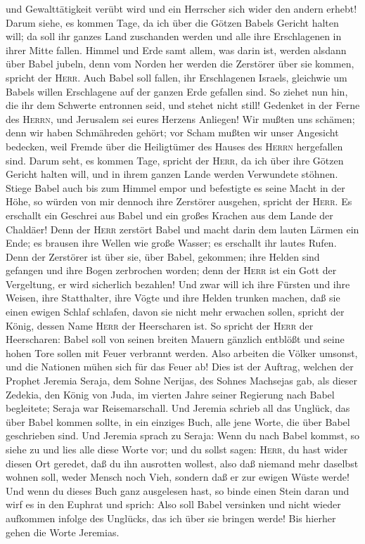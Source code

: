 und Gewalttätigkeit verübt wird und ein Herrscher sich wider den andern
erhebt!  Darum siehe, es kommen Tage, da ich über die
Götzen Babels Gericht halten will; da soll ihr ganzes Land zuschanden
werden und alle ihre Erschlagenen in ihrer Mitte fallen. 
Himmel und Erde samt allem, was darin ist, werden alsdann über Babel
jubeln, denn vom Norden her werden die Zerstörer über sie kommen,
spricht der \textsc{Herr}.  Auch Babel soll fallen, ihr
Erschlagenen Israels, gleichwie um Babels willen Erschlagene auf der
ganzen Erde gefallen sind.  So ziehet nun hin, die ihr
dem Schwerte entronnen seid, und stehet nicht still! Gedenket in der
Ferne des \textsc{Herrn}, und Jerusalem sei eures Herzens Anliegen!
 Wir mußten uns schämen; denn wir haben Schmähreden
gehört; vor Scham mußten wir unser Angesicht bedecken, weil Fremde über
die Heiligtümer des Hauses des \textsc{Herrn} hergefallen sind.
 Darum seht, es kommen Tage, spricht der \textsc{Herr},
da ich über ihre Götzen Gericht halten will, und in ihrem ganzen Lande
werden Verwundete stöhnen.  Stiege Babel auch bis zum
Himmel empor und befestigte es seine Macht in der Höhe, so würden von
mir dennoch ihre Zerstörer ausgehen, spricht der \textsc{Herr}.
 Es erschallt ein Geschrei aus Babel und ein großes
Krachen aus dem Lande der Chaldäer!  Denn der
\textsc{Herr} zerstört Babel und macht darin dem lauten Lärmen ein Ende;
es brausen ihre Wellen wie große Wasser; es erschallt ihr lautes Rufen.
 Denn der Zerstörer ist über sie, über Babel, gekommen;
ihre Helden sind gefangen und ihre Bogen zerbrochen worden; denn der
\textsc{Herr} ist ein Gott der Vergeltung, er wird sicherlich bezahlen!
 Und zwar will ich ihre Fürsten und ihre Weisen, ihre
Statthalter, ihre Vögte und ihre Helden trunken machen, daß sie einen
ewigen Schlaf schlafen, davon sie nicht mehr erwachen sollen, spricht
der König, dessen Name \textsc{Herr} der Heerscharen ist.
 So spricht der \textsc{Herr} der Heerscharen: Babel soll
von seinen breiten Mauern gänzlich entblößt und seine hohen Tore sollen
mit Feuer verbrannt werden. Also arbeiten die Völker umsonst, und die
Nationen mühen sich für das Feuer ab!  Dies ist der
Auftrag, welchen der Prophet Jeremia Seraja, dem Sohne Nerijas, des
Sohnes Machsejas gab, als dieser Zedekia, den König von Juda, im vierten
Jahre seiner Regierung nach Babel begleitete; Seraja war Reisemarschall.
 Und Jeremia schrieb all das Unglück, das über Babel
kommen sollte, in ein einziges Buch, alle jene Worte, die über Babel
geschrieben sind.  Und Jeremia sprach zu Seraja: Wenn du
nach Babel kommst, so siehe zu und lies alle diese Worte vor;
 und du sollst sagen: \textsc{Herr}, du hast wider diesen
Ort geredet, daß du ihn ausrotten wollest, also daß niemand mehr
daselbst wohnen soll, weder Mensch noch Vieh, sondern daß er zur ewigen
Wüste werde!  Und wenn du dieses Buch ganz ausgelesen
hast, so binde einen Stein daran und wirf es in den Euphrat und sprich:
 Also soll Babel versinken und nicht wieder aufkommen
infolge des Unglücks, das ich über sie bringen werde! Bis hierher gehen
die Worte Jeremias.

